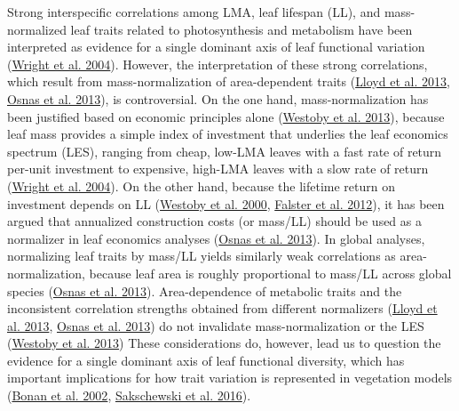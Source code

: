 \documentclass[
  12pt,
  a4paper,
,tablecaptionabove
]{scrartcl}
\begin{document}
Strong interspecific correlations among LMA, leaf lifespan (LL), and mass-normalized leaf traits related to photosynthesis and metabolism have been interpreted as evidence for a single dominant axis of leaf functional variation (\protect\hyperlink{ref-Wright2004a}{Wright et al. 2004}).
However, the interpretation of these strong correlations, which result from mass-normalization of area-dependent traits (\protect\hyperlink{ref-Lloyd2013}{Lloyd et al. 2013}, \protect\hyperlink{ref-Osnas2013}{Osnas et al. 2013}), is controversial.
On the one hand, mass-normalization has been justified based on economic principles alone (\protect\hyperlink{ref-Westoby2013}{Westoby et al. 2013}), because leaf mass provides a simple index of investment that underlies the leaf economics spectrum (LES), ranging from cheap, low-LMA leaves with a fast rate of return per-unit investment to expensive, high-LMA leaves with a slow rate of return (\protect\hyperlink{ref-Wright2004a}{Wright et al. 2004}).
On the other hand, because the lifetime return on investment depends on LL (\protect\hyperlink{ref-Westoby2000}{Westoby et al. 2000}, \protect\hyperlink{ref-Falster2012}{Falster et al. 2012}), it has been argued that annualized construction costs (or mass/LL) should be used as a normalizer in leaf economics analyses (\protect\hyperlink{ref-Osnas2013}{Osnas et al. 2013}).
In global analyses, normalizing leaf traits by mass/LL yields similarly weak correlations as area-normalization, because leaf area is roughly proportional to mass/LL across global species (\protect\hyperlink{ref-Osnas2013}{Osnas et al. 2013}).
Area-dependence of metabolic traits and the inconsistent correlation strengths obtained from different normalizers (\protect\hyperlink{ref-Lloyd2013}{Lloyd et al. 2013}, \protect\hyperlink{ref-Osnas2013}{Osnas et al. 2013}) do not invalidate mass-normalization or the LES (\protect\hyperlink{ref-Westoby2013}{Westoby et al. 2013})
These considerations do, however, lead us to question the evidence for a single dominant axis of leaf functional diversity, which has important implications for how trait variation is represented in vegetation models (\protect\hyperlink{ref-Bonan2002}{Bonan et al. 2002}, \protect\hyperlink{ref-Sakschewski2016}{Sakschewski et al. 2016}).
\end{document}

